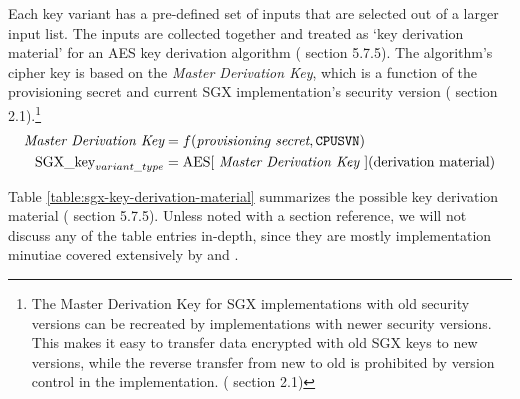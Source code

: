 Each key variant has a pre-defined set of inputs that are selected out of a larger input list. The inputs are collected together and treated as `key derivation material' for an AES key derivation algorithm (\cite{intel-sgx-explained-advanced} section 5.7.5). The algorithm's cipher key is based on the {\em Master Derivation Key}, which is a function of the provisioning secret and current SGX implementation's security version (\cite{sgx-epid-provisioning-attestation} section 2.1).\footnote{The Master Derivation Key for SGX implementations with old security versions can be recreated by implementations with newer security versions. This makes it easy to transfer data encrypted with old SGX keys to new versions, while the reverse transfer from new to old is prohibited by version control in the implementation. (\cite{sgx-epid-provisioning-attestation} section 2.1)}\vspace{.155cm}
\begin{align*}
    \textrm{\em Master Derivation Key} &= f(\textrm{\em provisioning secret}, \textrm{{\tt CPUSVN}}) \\
    \textrm{SGX\_key}_{variant\_type} &= \textrm{AES[ {\em Master Derivation Key }]}(\textrm{derivation material})
\end{align*}

Table \ref{table:sgx-key-derivation-material} summarizes the possible key derivation material (\cite{intel-sgx-explained-advanced} section 5.7.5). Unless noted with a section reference, we will not discuss any of the table entries in-depth, since they are mostly implementation minutiae covered extensively by \cite{intel-sgx-explained-advanced} and \cite{sgx-manual}.

